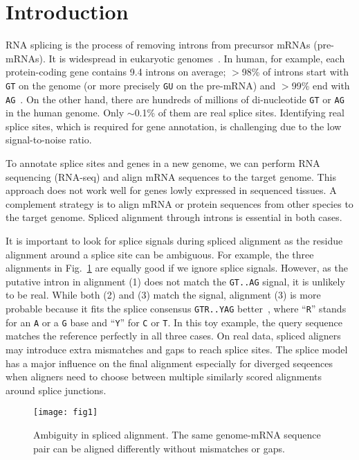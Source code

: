 \documentclass[webpdf,contemporary,large,namedate]{oup-authoring-template}%
\begin{document}
\section{Introduction}

RNA splicing is the process of removing introns from precursor mRNAs (pre-mRNAs).
It is widespread in eukaryotic genomes~\citep{Keren:2010aa}.
In human, for example, each protein-coding gene contains 9.4 introns on average;
$>$98\% of introns start with {\tt GT} on the genome (or more precisely {\tt GU} on the pre-mRNA)
and $>$99\% end with {\tt AG}~\citep{Sibley:2016vh}.
On the other hand, there are hundreds of millions of di-nucleotide {\tt GT} or {\tt AG}
in the human genome.
Only $\sim$0.1\% of them are real splice sites.
Identifying real splice sites, which is required for gene annotation,
is challenging due to the low signal-to-noise ratio.

To annotate splice sites and genes in a new genome,
we can perform RNA sequencing (RNA-seq) and align mRNA sequences to the target genome.
This approach does not work well for genes lowly expressed in sequenced tissues.
A complement strategy is to align mRNA or protein sequences from other species to the target genome.
Spliced alignment through introns is essential in both cases.

It is important to look for splice signals during spliced alignment
as the residue alignment around a splice site can be ambiguous.
For example, the three alignments in Fig.~\ref{fig:1} are equally good if we ignore splice signals.
However, as the putative intron in alignment (1) does not match the {\tt GT..AG}
signal, it is unlikely to be real.
While both (2) and (3) match the signal,
alignment (3) is more probable because it fits the splice consensus {\tt GTR..YAG} better~\citep{Irimia:2008aa,Iwata:2011aa},
where ``{\tt R}'' stands for an {\tt A} or a {\tt G} base and ``{\tt Y}'' for {\tt C} or {\tt T}.
In this toy example, the query sequence matches the reference perfectly in all three cases.
On real data, spliced aligners may introduce extra mismatches and gaps to reach splice sites.
The splice model has a major influence on the final alignment especially for diverged seqeences
when aligners need to choose between multiple similarly scored alignments around splice junctions.

\begin{figure}[b]
\centering
\texttt{[image: fig1]}
\caption{Ambiguity in spliced alignment.
The same genome-mRNA sequence pair can be aligned differently without mismatches or gaps.}\label{fig:1}
\end{figure}
\end{document}

